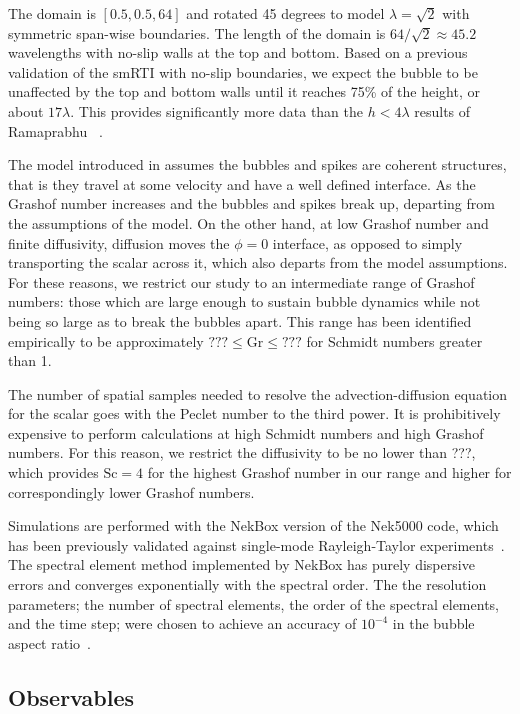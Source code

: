 The domain is $\left[0.5, 0.5, 64\right]$ and rotated 45 degrees to model $\lambda = \sqrt{2}$ with symmetric span-wise boundaries.
The length of the domain is $64/\sqrt{2} \approx 45.2$ wavelengths with no-slip walls at the top and bottom.
Based on a previous validation of the smRTI with no-slip boundaries, we expect the bubble to be unaffected by the top and bottom walls until it reaches 75\% of the height, or about $17\lambda$.
This provides significantly more data than the $h < 4 \lambda$ results of Ramaprabhu \etal~\cite{Ramaprabhu2012}.

The model introduced in  assumes the bubbles and spikes are coherent structures, that is they travel at some velocity and have a well defined interface.
As the Grashof number increases and the bubbles and spikes break up, departing from the assumptions of the model.
On the other hand, at low Grashof number and finite diffusivity, diffusion moves the $\phi = 0$ interface, as opposed to simply transporting the scalar across it, which also departs from the model assumptions.
For these reasons, we restrict our study to an intermediate range of Grashof numbers: those which are large enough to sustain bubble dynamics while not being so large as to break the bubbles apart.
This range has been identified empirically to be approximately $??? \le \text{Gr} \le ???$ for Schmidt numbers greater than 1.

The number of spatial samples needed to resolve the advection-diffusion equation for the scalar goes with the Peclet number to the third power.
It is prohibitively expensive to perform calculations at high Schmidt numbers and high Grashof numbers.  
For this reason, we restrict the diffusivity to be no lower than ???, which provides $\text{Sc} = 4$ for the highest Grashof number in our range and higher for correspondingly lower Grashof numbers.

Simulations are performed with the NekBox version of the Nek5000 code, which has been previously validated against single-mode Rayleigh-Taylor experiments~\cite{Validation2016,Wilkinson2007}.
The spectral element method implemented by NekBox has purely dispersive errors and converges exponentially with the spectral order.
The the resolution parameters; the number of spectral elements, the order of the spectral elements, and the time step; were chosen to achieve an accuracy of $10^{-4}$ in the bubble aspect ratio~\cite{Convergence2016}.

\subsection{Observables}

